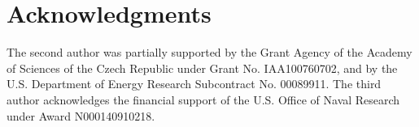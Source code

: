 \documentclass[mathpazo]{cicp}
\begin{document}


\maketitle









\section*{Acknowledgments}
The second author was partially supported by the Grant Agency of the Academy of 
Sciences of the Czech Republic under Grant No. IAA100760702, and by the U.S.
Department of Energy Research Subcontract No. 00089911. 
The third author acknowledges the financial support of the U.S. Office of Naval Research 
under Award N000140910218.



\end{document}
